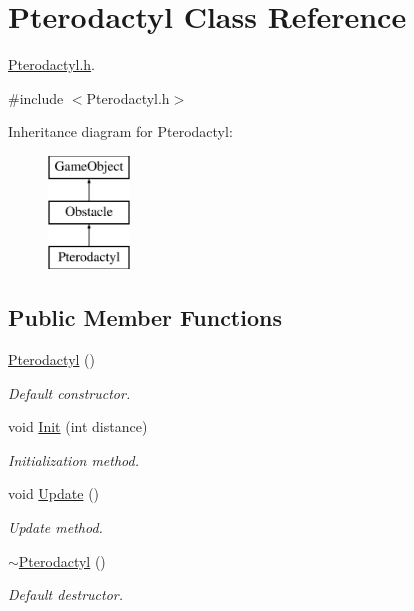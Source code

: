 \hypertarget{class_pterodactyl}{}\section{Pterodactyl Class Reference}
\label{class_pterodactyl}


\mbox{\hyperlink{_pterodactyl_8h_source}{Pterodactyl.\+h}}.  




{\ttfamily \#include $<$Pterodactyl.\+h$>$}

Inheritance diagram for Pterodactyl\+:\begin{figure}[H]
\begin{center}
\leavevmode
\includegraphics[height=3.000000cm]{class_pterodactyl}
\end{center}
\end{figure}
\subsection*{Public Member Functions}
\begin{DoxyCompactItemize}
\item 
\mbox{\hyperlink{class_pterodactyl_ae667ed30c8198eae8027bf34b2f90034}{Pterodactyl}} ()
\begin{DoxyCompactList}\small\item\em Default constructor. \end{DoxyCompactList}\item 
void \mbox{\hyperlink{class_pterodactyl_a55037eb1d5ed42027e9c0cf9891b3f70}{Init}} (int distance)
\begin{DoxyCompactList}\small\item\em Initialization method. \end{DoxyCompactList}\item 
\mbox{\label{class_pterodactyl_a8ab71be091355092560c40746bf53bef}} 
void \mbox{\hyperlink{class_pterodactyl_a8ab71be091355092560c40746bf53bef}{Update}} ()
\begin{DoxyCompactList}\small\item\em Update method. \end{DoxyCompactList}\item 
\mbox{\label{class_pterodactyl_a57c101dcc34661693bb424770d590c0a}} 
\mbox{\hyperlink{class_pterodactyl_a57c101dcc34661693bb424770d590c0a}{$\sim$\+Pterodactyl}} ()
\begin{DoxyCompactList}\small\item\em Default destructor. \end{DoxyCompactList}\end{DoxyCompactItemize}
